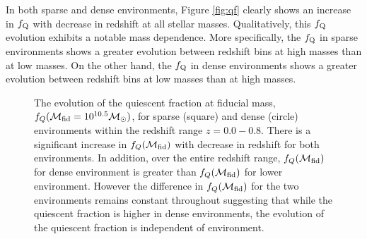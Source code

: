 \documentclass{emulateapj}
\begin{document}
In both sparse and dense environments, Figure \ref{fig:qf}
clearly shows an increase in $f_{\rm{Q}}$ with decrease in redshift at all 
stellar masses. Qualitatively, this $f_{\rm{Q}}$ evolution 
exhibits a notable mass dependence. More specifically, 
the $f_{\rm{Q}}$ in sparse environments shows a greater 
evolution between redshift bins at high masses than at low 
masses. On the other hand, the $f_{\rm{Q}}$ in dense 
environments shows a greater evolution between redshift 
bins at low masses than at high masses.

\begin{figure}
    \begin{center}
        \leavevmode
        \caption{The evolution of the quiescent fraction at fiducial mass, $f_{Q}(\mathcal{M}_{\rm{fid}} = 10^{10.5} \mathcal{M}_\odot)$, for sparse (square) and dense (circle) environments within the redshift range $z = 0.0 - 0.8$.  There is a significant increase in $f_{Q}(\mathcal{M}_{\rm{fid}})$ with decrease in redshift for both environments. In addition, over the entire redshift range, $f_{Q}(\mathcal{M}_{\rm{fid}})$ for dense environment is greater than $f_{Q}(\mathcal{M}_{\rm{fid}})$ for lower environment. However the difference in $f_{Q}(\mathcal{M}_{\rm{fid}})$ for the two environments remains constant throughout suggesting that while the quiescent fraction is higher in dense environments, the evolution of the quiescent fraction is independent of environment.}         \label{fig:qffit}
    \end{center}
\end{figure}
\end{document}

